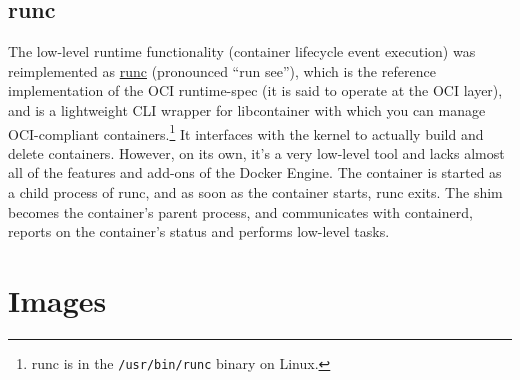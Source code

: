 \documentclass[table, xcdraw]{article}%
\begin{document}
\subsection{runc}

The low-level runtime functionality (container lifecycle event execution) was reimplemented as \href{https://github.com/opencontainers/runc}{runc} (pronounced “run see”), which is the reference implementation of the OCI runtime-spec (it is said to operate at the OCI layer), and is a lightweight CLI wrapper for libcontainer with which you can manage OCI-compliant containers.\footnote{runc is in the \texttt{/usr/bin/runc} binary on Linux.} It interfaces with the kernel to actually build and delete containers. However, on its own, it's a very low-level tool and lacks almost all of the features and add-ons of the Docker Engine. The container is started as a child process of runc, and as soon as the container starts, runc exits. The shim becomes the container's parent process, and communicates with containerd, reports on the container’s status and performs low-level tasks.

\section{Images}
\end{document}

